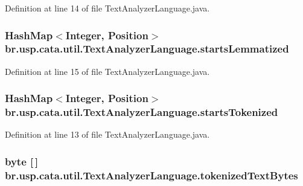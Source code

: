 Definition at line 14 of file Text\+Analyzer\+Language.\+java.

\hypertarget{classbr_1_1usp_1_1cata_1_1util_1_1_text_analyzer_language_aff99f3709624a14b66386f13565c17c0}{
\subsubsection[{starts\+Lemmatized}]{\setlength{\rightskip}{0pt plus 5cm}Hash\+Map$<$Integer, {\bf Position}$>$ br.\+usp.\+cata.\+util.\+Text\+Analyzer\+Language.\+starts\+Lemmatized\hspace{0.3cm}{\ttfamily [protected]}}}\label{classbr_1_1usp_1_1cata_1_1util_1_1_text_analyzer_language_aff99f3709624a14b66386f13565c17c0}


Definition at line 15 of file Text\+Analyzer\+Language.\+java.

\hypertarget{classbr_1_1usp_1_1cata_1_1util_1_1_text_analyzer_language_ac18cfd71df27ee79aa0ed4af4f76d1ae}{
\subsubsection[{starts\+Tokenized}]{\setlength{\rightskip}{0pt plus 5cm}Hash\+Map$<$Integer, {\bf Position}$>$ br.\+usp.\+cata.\+util.\+Text\+Analyzer\+Language.\+starts\+Tokenized\hspace{0.3cm}{\ttfamily [protected]}}}\label{classbr_1_1usp_1_1cata_1_1util_1_1_text_analyzer_language_ac18cfd71df27ee79aa0ed4af4f76d1ae}


Definition at line 13 of file Text\+Analyzer\+Language.\+java.

\hypertarget{classbr_1_1usp_1_1cata_1_1util_1_1_text_analyzer_language_a945cbd60b872e79913ef762b25071eb8}{
\subsubsection[{tokenized\+Text\+Bytes}]{\setlength{\rightskip}{0pt plus 5cm}byte \mbox{[}$\,$\mbox{]} br.\+usp.\+cata.\+util.\+Text\+Analyzer\+Language.\+tokenized\+Text\+Bytes\hspace{0.3cm}{\ttfamily [protected]}}}\label{classbr_1_1usp_1_1cata_1_1util_1_1_text_analyzer_language_a945cbd60b872e79913ef762b25071eb8}


